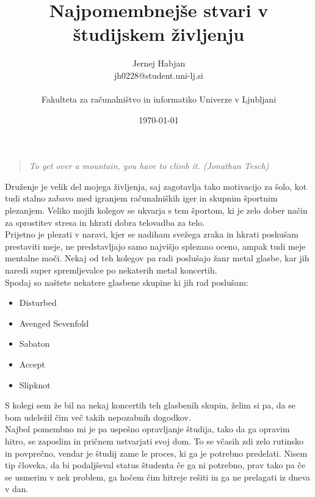 \documentclass[11pt,a4paper]{article}
\title{Najpomembnejše stvari v študijskem življenju}
\author{Jernej Habjan\\
jh0228@student.uni-lj.si\\
\ \\
Fakulteta za računalništvo in informatiko Univerze v Ljubljani
\date{\today}         
}
\begin{document}
\maketitle

\begin{quote}
	\textit{To get over a mountain, you have to climb it. (Jonathan Tesch)}
\end{quote}


Druženje je velik del mojega življenja, saj zagotavlja tako motivacijo za šolo, kot tudi stalno zabavo med igranjem računalniških iger in skupnim športnim plezanjem. 
Veliko mojih kolegov se ukvarja s tem športom, ki je zelo dober način za sprostitev stresa in hkrati dobra telovadba za telo. \\
Prijetno je plezati v naravi, kjer se nadiham svežega zraka in hkrati poskušam prestaviti meje, ne predstavljajo samo najvišjo splezano oceno, ampak tudi meje mentalne moči.
Nekaj od teh kolegov pa radi poslušajo žanr metal glasbe, kar jih naredi super spremljevalce po nekaterih metal koncertih.\\

Spodaj so naštete nekatere glasbene skupine ki jih rad poslušam:

\begin{itemize}
\item Disturbed
\item Avenged Sevenfold
\item Sabaton
\item Accept
\item Slipknot
\end{itemize}
S kolegi sem že bil na nekaj koncertih teh glasbenih skupin, želim si pa, da se bom udeležil čim več takih nepozabnih dogodkov.\\

Najbol pomembno mi je pa uspešno opravljanje študija, tako da ga opravim hitro, se zaposlim in pričnem ustvarjati svoj dom.
To se včasih zdi zelo rutinsko in povprečno, vendar je študij zame le proces, ki ga je potrebno predelati.
Nisem tip človeka, da bi podaljševal status študenta če ga ni potrebno, prav tako pa če se usmerim v nek problem, ga hočem čim hitreje rešiti in ga ne prelagati iz dneva v dan.
\end{document}
